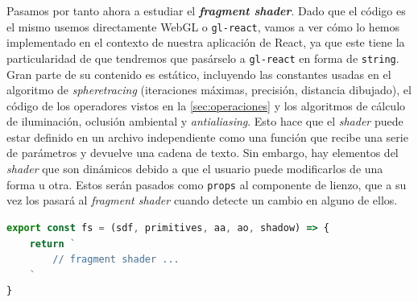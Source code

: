 Pasamos por tanto ahora a estudiar el \textbf{\textit{fragment shader}}. Dado que el código es el mismo usemos directamente WebGL o \texttt{gl-react}, vamos a ver cómo lo hemos implementado en el contexto de nuestra aplicación de React, ya que este tiene la particularidad de que tendremos que pasárselo a \texttt{gl-react} en forma de \texttt{string}. Gran parte de su contenido es estático, incluyendo las constantes usadas en el algoritmo de \textit{spheretracing} (iteraciones máximas, precisión, distancia dibujado), el código de los operadores vistos en la \autoref{sec:operaciones} y los algoritmos de cálculo de iluminación, oclusión ambiental y \textit{antialiasing}. Esto hace que el \textit{shader} puede estar definido en un archivo independiente como una función que recibe una serie de parámetros y devuelve una cadena de texto. Sin embargo, hay elementos del \textit{shader} que son dinámicos debido a que el usuario puede modificarlos de una forma u otra. Estos serán pasados como \texttt{props} al componente de lienzo, que a su vez los pasará al \textit{fragment shader} cuando detecte un cambio en alguno de ellos.
\begin{lstlisting}[language=JavaScript, caption=Definición del procesador de fragmentos]
export const fs = (sdf, primitives, aa, ao, shadow) => {
    return `
        // fragment shader ...
    `
}
\end{lstlisting}


